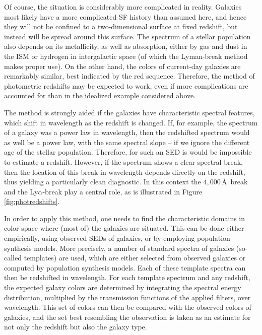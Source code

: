 \documentclass[a4paper,11pt]{article}
\begin{document}
{\noindent}Of course, the situation is considerably more complicated in reality. Galaxies most likely have a more complicated SF history than assumed here, and hence they will not be confined to a two-dimensional surface at fixed redshift, but instead will be spread around this surface. The spectrum of a stellar population also depends on its metallicity, as well as absorption, either by gas and dust in the ISM or hydrogen in intergalactic space (of which the Lyman-break method makes proper use). On the other hand, the colors of current-day galaxies are remarkably similar, best indicated by the red sequence. Therefore, the method of photometric redshifts may be expected to work, even if more complications are accounted for than in the idealized example considered above.

{\noindent}The method is strongly aided if the galaxies have characteristic spectral features, which shift in wavelength as the redshift is changed. If, for example, the spectrum of a galaxy was a power law in wavelength, then the redshifted spectrum would as well be a power law, with the same spectral slope -- if we ignore the different age of the stellar population. Therefore, for such an SED is would be impossible to estimate a redshift. However, if the spectrum shows a clear spectral break, then the location of this break in wavelength depends directly on the redshift, thus yielding a particularly clean diagnostic. In this context the $4,000$\,\AA~break and the Ly$\alpha$-break play a central role, as is illustrated in Figure \ref{fig:photredshifts}.

{\noindent}In order to apply this method, one needs to find the characteristic domains in color space where (most of) the galaxies are situated. This can be done either empirically, using observed SEDs of galaxies, or by employing population synthesis models. More precisely, a number of standard spectra of galaxies (so-called templates) are used, which are either selected from observed galaxies or computed by population synthesis models. Each of these template spectra can then be redshifted in wavelength. For each template spectrum and any redshift, the expected galaxy colors are determined by integrating the spectral energy distribution, multiplied by the transmission functions of the applied filters, over wavelength. This set of colors can then be compared with the observed colors of galaxies, and the set best resembling the observation is taken as an estimate for not only the redshift but also the galaxy type.
\end{document}
